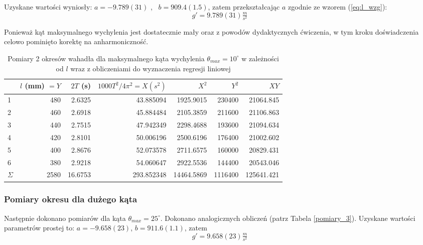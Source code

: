 \documentclass[a4paper]{article}
\newlength{\du}
\begin{document}
Uzyskane wartości wyniosły: $a = -9.789(31)$  , \ $b = 909.4(1.5)$,
zatem przekształcając $a$ zgodnie ze wzorem (\ref{eq:l_wzg}):  \[g' = 9.789(31)  \tfrac{m}{s^2}\]

Ponieważ kąt maksymalnego wychylenia jest dostatecznie mały oraz z powodów dydaktycznych ćwiczenia,
w tym kroku doświadczenia celowo pominięto korektę na anharmoniczność.

\begin{table}[h!]
\centering
	\begin{tabular}{lrrrrrr}
	\toprule
	{} & $l$ (mm) $=Y$ &  $2T$ (s) & \small$1000T^2/4\pi^2$\normalsize$=X (s^2)$ & $X^2$ & $Y^2$ & $XY$ \\
	\midrule
	1 &     480 &  2.6325 &  43.885094 &  1925.9015 &  230400 &  21064.845 \\
	2 &     460 &  2.6918 &  45.884484 &  2105.3859 &  211600 &  21106.863 \\
	3 &     440 &  2.7515 &  47.942349 &  2298.4688 &  193600 &  21094.634 \\
	4 &     420 &  2.8101 &  50.006196 &  2500.6196 &  176400 &  21002.602 \\
	5 &     400 &  2.8676 &  52.073578 &  2711.6575 &  160000 &  20829.431 \\
	6 &     380 &  2.9218 &  54.060647 &  2922.5536 &  144400 &  20543.046 \\
	\midrule
	$\Sigma$ & 2580 & 16.6753 & 293.852348 & 14464.5869 & 1116400 & 125641.421 \\
	\end{tabular}
\caption{Pomiary 2 okresów wahadła dla maksymalnego kąta wychylenia $\theta_{max} = 10^\circ$ w  zależności od $l$ wraz z obliczeniami do wyznaczenia regresji liniowej}
\label{pomiary_2}
\end{table}




\subsubsection{Pomiary okresu dla dużego kąta}

Następnie dokonano pomiarów dla kąta $\theta_{max} = 25^\circ$. 
Dokonano analogicznych obliczeń (patrz Tabela \ref{pomiary_3}).
Uzyskane wartości parametrów prostej to: $a = -9.658(23)$, $b = 911.6(1.1)$,
zatem \[g' = 9.658(23)  \tfrac{m}{s^2}\]
\end{document}
